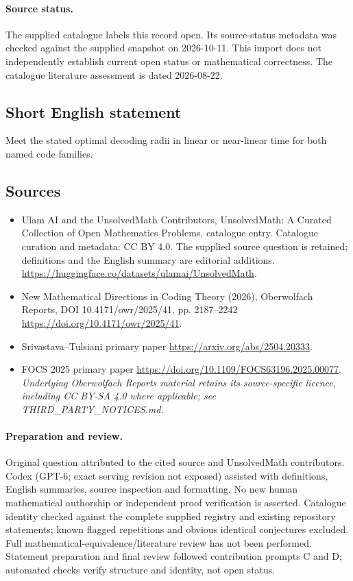 \documentclass[11pt]{article}
\begin{document}
\paragraph{Source status.}
The supplied catalogue labels this record open. Its source-status metadata was checked against the supplied snapshot on 2026-10-11. This import does not independently establish current open status or mathematical correctness. The catalogue literature assessment is dated 2026-08-22.
\subsection{Short English statement}
Meet the stated optimal decoding radii in linear or near-linear time for both named code families.
\subsection{Sources}
\begin{itemize}
\item[\hypertarget{source:statement:1}{S1}] Ulam AI and the UnsolvedMath Contributors, UnsolvedMath: A Curated Collection of Open Mathematics Problems, catalogue entry. Catalogue curation and metadata: CC BY 4.0. The supplied source question is retained; definitions and the English summary are editorial additions.
\url{https://huggingface.co/datasets/ulamai/UnsolvedMath}.
\item[\hypertarget{source:statement:2}{S2}] New Mathematical Directions in Coding Theory (2026), Oberwolfach Reports, DOI 10.4171/owr/2025/41, pp. 2187--2242
\url{https://doi.org/10.4171/owr/2025/41}.
\item[\hypertarget{source:statement:3}{S3}] Srivastava--Tulsiani primary paper
\url{https://arxiv.org/abs/2504.20333}.
\item[\hypertarget{source:statement:4}{S4}] FOCS 2025 primary paper
\url{https://doi.org/10.1109/FOCS63196.2025.00077}.
\textit{Underlying Oberwolfach Reports material retains its source-specific licence, including CC BY-SA 4.0 where applicable; see THIRD\_PARTY\_NOTICES.md.}
\end{itemize}
\paragraph{Preparation and review.}
Original question attributed to the cited source and UnsolvedMath contributors. Codex (GPT-6; exact serving revision not exposed) assisted with definitions, English summaries, source inspection and formatting. No new human mathematical authorship or independent proof verification is asserted. Catalogue identity checked against the complete supplied registry and existing repository statements; known flagged repetitions and obvious identical conjectures excluded. Full mathematical-equivalence/literature review has not been performed. Statement preparation and final review followed contribution prompts C and D; automated checks verify structure and identity, not open status.
\label{end:statement}
\end{document}
